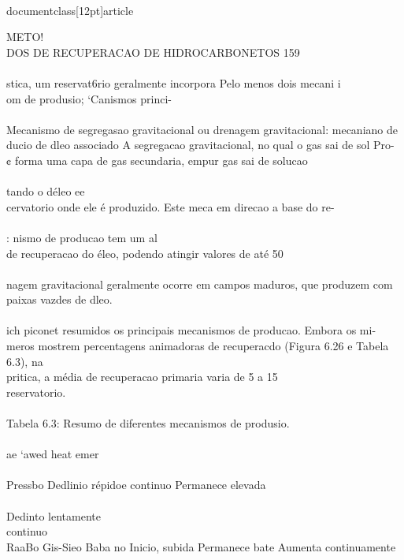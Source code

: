 \\documentclass[12pt]{article}
\begin{document}
{METO!\\
DOS DE RECUPERACAO DE HIDROCARBONETOS 159\\
\\
stica, um reservat6rio geralmente incorpora Pelo menos dois mecani i\\
om de produsio; ‘Canismos princi-\\
\\
Mecanismo de segregasao gravitacional ou drenagem gravitacional: mecaniano de\\
ducio de dleo associado A segregacao gravitacional, no qual o gas sai de sol Pro-\\
¢ forma uma capa de gas secundaria, empur gas sai de solucao\\
\\
tando o déleo ee\\
cervatorio onde ele é produzido. Este meca em direcao a base do re-\\
\\
: nismo de producao tem um al\\
de recuperacao do éleo, podendo atingir valores de até 50\\%
\\
nagem gravitacional geralmente ocorre em campos maduros, que produzem com\\
paixas vazdes de dleo.\\
\\
ich piconet resumidos os principais mecanismos de producao. Embora os mi-\\
meros mostrem percentagens animadoras de recuperacdo (Figura 6.26 e Tabela 6.3), na\\
pritica, a média de recuperacao primaria varia de 5 a 15\\%
reservatorio.\\
\\
Tabela 6.3: Resumo de diferentes mecanismos de produsio.\\
\\
ae ‘awed heat emer\\
\\
Pressbo Dedlinio répidoe continuo Permanece elevada\\
\\
Dedinto lentamente\\
continuo\\
RaaBo Gis-Sieo Baba no Inicio, subida Permanece bate Aumenta continuamente\\
}
\end{document}
